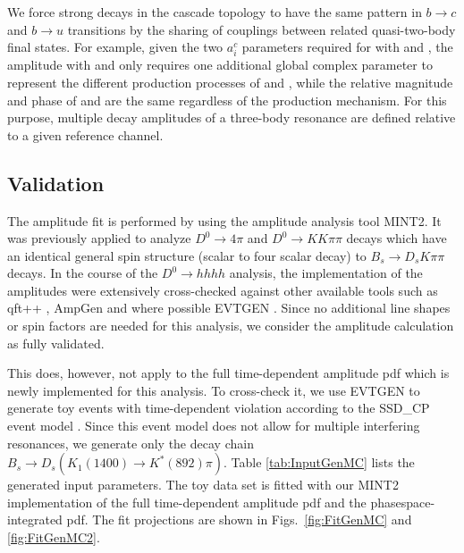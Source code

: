 We force strong decays in the cascade topology to have the same pattern in $b \to c$ and $b \to u$ transitions by the sharing of couplings between related
quasi-two-body final states. 
For example, given the two $a_i^c$ parameters required for
 with 
and , 
the amplitude  with  and
 only requires one additional global
complex parameter to represent the different production processes of
 and ,
while the relative magnitude and phase of  and  are the same regardless of the production mechanism. 
For this purpose, multiple decay amplitudes of a three-body resonance are defined relative to a given reference channel.

\clearpage
\subsection{Validation}

The amplitude fit is performed by using the amplitude analysis tool \textsf{MINT2}.
It was previously applied to analyze $D^0 \to 4 \pi$ and $D^0 \to KK\pi\pi$ decays \cite{dArgent:2017gzv}
which have an identical general spin structure (\ie scalar to four scalar decay) to $B_s \to D_s K \pi\pi$ decays. 
In the course of the $D^0 \to hhhh$ analysis, the implementation of the amplitudes were extensively cross-checked against 
other available tools such as \textsf{qft++} \cite{Williams:2008wu}, \textsf{AmpGen} \cite{Aaij:2017kbo} and where possible \textsf{EVTGEN} \cite{Lange:2001uf}.
Since no additional line shapes or spin factors are needed for this analysis, we consider the amplitude calculation as fully validated.

This does, however, not apply to the full time-dependent amplitude pdf which is newly implemented for this analysis.
To cross-check it, we use \textsf{EVTGEN} to generate toy events with time-dependent \CP violation according to the \textsf{SSD\_CP} event model \cite{Lange:2001uf}.
Since this event model does not allow for multiple interfering resonances, we generate only the decay chain 
$B_s \to D_s \left( K_1(1400) \to K^{*}(892) \pi \right)$. Table \ref{tab:InputGenMC}  lists the generated input parameters.
The toy data set is fitted with our \textsf{MINT2} implementation of the full time-dependent amplitude pdf and the phasespace-integrated pdf.
The fit projections are shown in Figs.~\ref{fig:FitGenMC} and \ref{fig:FitGenMC2}.

